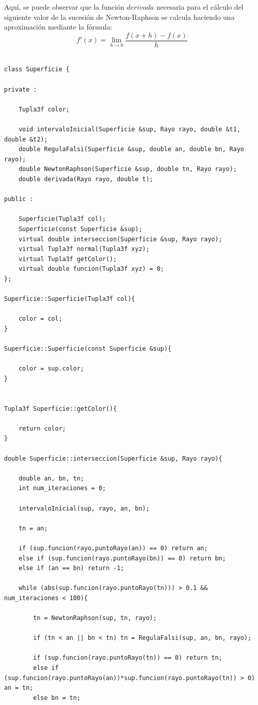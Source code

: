 Aquí, se puede observar que la función $derivada$ necesaria para el cálculo del siguiente valor de la sucesión de Newton-Raphson se calcula haciendo una aproximación mediante la fórmula:
${ }$\\

$$ f'(x) = \lim_{h \to 0} \frac{f(x+h) - f(x)}{h} $$
${ }$\\


\begin{lstlisting}[style=Consola]
class Superficie {

private :

	Tupla3f color;

	void intervaloInicial(Superficie &sup, Rayo rayo, double &t1, double &t2);
	double RegulaFalsi(Superficie &sup, double an, double bn, Rayo rayo);
	double NewtonRaphson(Superficie &sup, double tn, Rayo rayo);
	double derivada(Rayo rayo, double t);

public :

	Superficie(Tupla3f col);
	Superficie(const Superficie &sup);
	virtual double interseccion(Superficie &sup, Rayo rayo);
	virtual Tupla3f normal(Tupla3f xyz);
	virtual Tupla3f getColor();
	virtual double funcion(Tupla3f xyz) = 0;
};

Superficie::Superficie(Tupla3f col){

	color = col;
}

Superficie::Superficie(const Superficie &sup){

	color = sup.color;
}


Tupla3f Superficie::getColor(){

	return color;
}

double Superficie::interseccion(Superficie &sup, Rayo rayo){

	double an, bn, tn;
	int num_iteraciones = 0;

	intervaloInicial(sup, rayo, an, bn);

	tn = an;

	if (sup.funcion(rayo.puntoRayo(an)) == 0) return an;
	else if (sup.funcion(rayo.puntoRayo(bn)) == 0) return bn;
	else if (an == bn) return -1;

	while (abs(sup.funcion(rayo.puntoRayo(tn))) > 0.1 && num_iteraciones < 100){
	
		tn = NewtonRaphson(sup, tn, rayo);

		if (tn < an || bn < tn) tn = RegulaFalsi(sup, an, bn, rayo);

		if (sup.funcion(rayo.puntoRayo(tn)) == 0) return tn;
		else if (sup.funcion(rayo.puntoRayo(an))*sup.funcion(rayo.puntoRayo(tn)) > 0) an = tn;
		else bn = tn;
		

\end{lstlisting}
